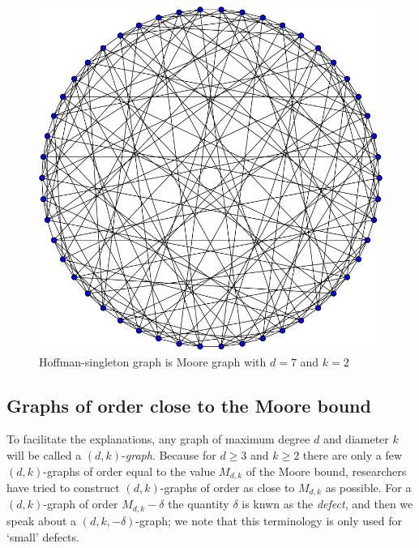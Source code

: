 \documentclass[a4paper,12pt,oneside]{report}%
\begin{document}
\begin{figure}[!ht]
	\centering
	\includegraphics[scale=0.33]{Hoffman-Singleton_graph.png}
	\caption{Hoffman-singleton graph is Moore graph with $d=7$ and $k=2$ }
\end{figure}



\subsection{Graphs of order close to the Moore bound}
To facilitate the explanations, any graph of maximum degree $d$ and diameter $k$ will be called a $(d,k)$-{\em graph}. Because for $d\ge 3$ and $k\ge 2$ there are only a few $(d,k)$-graphs of order equal to the value $M_{d,k}$ of the Moore bound, researchers have tried to construct $(d,k)$-graphs of order as close to $M_{d,k}$ as possible. For a $(d,k)$-graph of order $M_{d,k}-\delta$ the quantity $\delta$ is knwn as the {\em defect}, and then we speak about a $(d,k,-\delta)$-graph; we note that this terminology is only used for `small' defects.
\medskip
\end{document}
